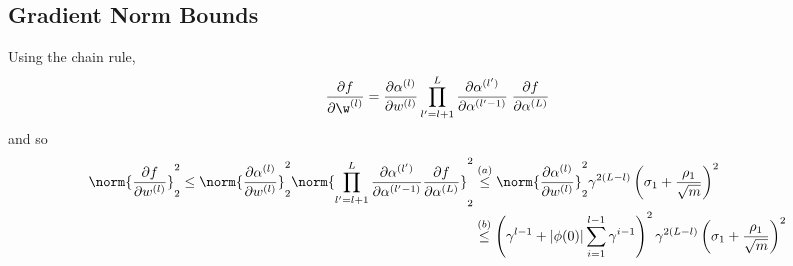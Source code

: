 

\subsection{Gradient Norm Bounds}
\label{ssec:app_gradbnd}
%
\lemgradbnd*
\proof
Using the chain rule,
\begin{equation*}
    \frac{\partial f}{\partial \w^{(l)}}= \frac{\partial \alpha^{(l)}}{\partial w^{(l)}}\prod^{L}_{l'=l+1}\frac{\partial \alpha^{(l')}}{\partial \alpha^{(l'-1)}}\;\frac{\partial f}{\partial \alpha^{(L)}}
\end{equation*}
and so
\begin{align*}
    \norm{\frac{\partial f}{\partial w^{(l)}}}_2^2
    \leq 
    \norm{\frac{\partial \alpha^{(l)}}{\partial w^{(l)}}}_2^2
    \norm{\prod^{L}_{l'=l+1}\frac{\partial \alpha^{(l')}}{\partial \alpha^{(l'-1)}}\frac{\partial f}{\partial \alpha^{(L)}}}_2^2&\overset{(a)}{\leq} \norm{\frac{\partial \alpha^{(l)}}{\partial w^{(l)}}}_2^2\gamma^{2(L-l)}\left(\sigma_1+\frac{\rho_1}{\sqrt{m}}\right)^2\\
    &\overset{(b)}{\leq}
    \left(\gamma^{l-1} + |\phi(0)| \sum_{i=1}^{l-1} \gamma^{i-1} \right)^2\gamma^{2(L-l)}\left(\sigma_1+\frac{\rho_1}{\sqrt{m}}\right)^2
\end{align*}
